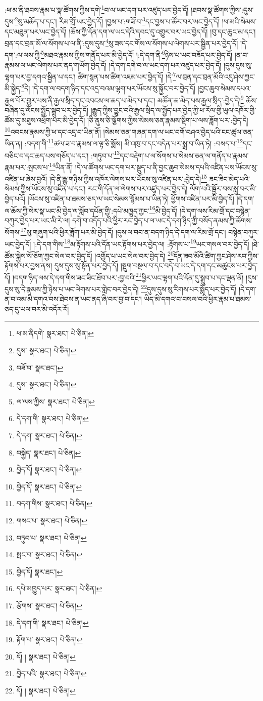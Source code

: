 :ཕ་མ་ནི་ཐབས་རྣམ་པ་སྣ་ཚོགས་ཀྱིས་དགེ་\footnote{ཕ་མ་ནིདགེ་  སྣར་ཐང་།  པེ་ཅིན། }བ་ལ་ཡང་དག་པར་འཛུད་པར་བྱེད་དོ། །ཐབས་སྣ་ཚོགས་ཀྱིས་:དུས་དུས་\footnote{དུས་  སྣར་ཐང་།  པེ་ཅིན། }སུ་མཆོད་པ་དང་། རིམ་གྲོ་ཡང་བྱེད་དོ། །བྱས་པ་:གཟོ་བ་\footnote{བཟོ་བ་  སྣར་ཐང་། }དང་བྱས་པ་ཚོར་བར་ཡང་བྱེད་དོ། །ཕ་མའི་སེམས་དང་མཐུན་པར་ཡང་བྱེད་དོ། །ཆོས་ཀྱི་དོན་དག་ལ་ཡང་དེའི་དབང་དུ་འགྱུར་བར་ཡང་བྱེད་དོ། །བུ་དང་ཆུང་མ་དང་། བྲན་དང་བྲན་མོ་ལ་སོགས་པ་ལ་ནི་:དུས་དུས་\footnote{དུས་  སྣར་ཐང་།  པེ་ཅིན། }སུ་ཟས་དང་གོས་ལ་སོགས་པ་ལེགས་པར་སྦྱིན་པར་བྱེད་དོ། །དེ་དག་:ལ་ལས་ཀྱི་\footnote{ལ་ལས་ཀྱིས་  སྣར་ཐང་།  པེ་ཅིན། }མཐའ་རྣམས་ཀྱིས་གནོད་པར་མི་བྱེད་དོ། །:དེ་དག་ནི་\footnote{དེ་དག་གི་  སྣར་ཐང་།  པེ་ཅིན། }ཉེས་པ་ཡང་བཟོད་པར་བྱེད་དོ། །ན་བ་རྣམས་ལ་ཡང་ལེགས་པར་ནད་གཡོག་བྱེད་དོ། །དེ་དག་དགེ་བ་ལ་ཡང་དག་པར་འཛུད་པར་བྱེད་དོ། །དུས་དུས་སུ་ལྷག་པར་བྱ་དགའ་སྦྱིན་པ་དང་། ཚིག་སྙན་པས་ཚིག་འཇམ་པར་བྱེད་དོ། །དེ་\footnote{དེ་དག་  སྣར་ཐང་།  པེ་ཅིན། }ལ་བྲན་དང་བྲན་མོའི་འདུ་ཤེས་ཀྱང་མི་སྐྱེད་\footnote{བསྐྱེད་  སྣར་ཐང་།  པེ་ཅིན། }དེ། །དེ་དག་ལ་བདག་ཉིད་དང་འདྲ་བའམ་ལྷག་པར་ཡོངས་སུ་སྐྱོང་བར་བྱེད་དོ། །བྱང་ཆུབ་སེམས་དཔའ་རྒྱལ་པོར་གྱུར་པས་ནི་རྒྱལ་སྲིད་དང་འབངས་ལ་ཆད་པ་མེད་པ་དང་། མཚོན་ཆ་མེད་པས་རྒྱལ་སྲིད་:བྱེད་དེ།\footnote{བྱེད་དོ།  སྣར་ཐང་།  པེ་ཅིན། } ཆོས་བཞིན་དུ་ལོངས་སྤྱོད་སྒྲུབ་པར་བྱེད་དོ། །རྒྱུད་ཀྱིས་བྱུང་བའི་རྒྱལ་སྲིད་ལ་སྤྱོད་པར་བྱེད་ཀྱི་ཕ་རོལ་གྱི་ཡུལ་འཁོར་གྱི་ཚོམ་དུ་མཐུས་འཕྲོག་པར་མི་བྱེད་དོ། །ཅི་ནུས་ཅི་ལྕོགས་ཀྱིས་སེམས་ཅན་རྣམས་སྡིག་པ་ལས་ཟློག་པར་:བྱེད་དེ། \footnote{བྱེད་དོ་  སྣར་ཐང་།  པེ་ཅིན། }འབངས་རྣམས་ཀྱི་ཕ་དང་འདྲ་བ་ཡིན་ནོ། །སེམས་ཅན་གཞན་དག་ལ་ཡང་བགོ་བཤའ་བྱེད་པའི་ངང་ཚུལ་ཅན་ཡིན་ན། :བདག་གི་\footnote{བདག་གིས་  སྣར་ཐང་།  པེ་ཅིན། }ཚལ་ཟ་བ་རྣམས་ལ་ལྟ་ཅི་སྨོས། མི་འཁུ་བ་དང་བདེན་པར་སྨྲ་བ་ཡིན་ཏེ། :བསད་པ་\footnote{གསང་པ་  སྣར་ཐང་།  པེ་ཅིན། }དང་བཅིང་བ་དང་ཆད་པས་གཅོད་པ་དང་། :གཏུབ་པ་\footnote{བཏུབ་པ་  སྣར་ཐང་།  པེ་ཅིན། }དང་བརྡེག་པ་ལ་སོགས་པ་སེམས་ཅན་ལ་གནོད་པ་རྣམས་རྣམ་པར་:སྤངས་པ་\footnote{སྤང་བ་  སྣར་ཐང་།  པེ་ཅིན། }ཡིན་ནོ། །དེ་ལ་ཚོགས་ཡང་དག་པར་སྡུད་པ་ནི་བྱང་ཆུབ་སེམས་དཔའི་འཛིན་པས་ཡོངས་སུ་འཛིན་པ་ཞེས་བྱའོ། །དེ་ནི་རྒྱུ་གཉིས་ཀྱིས་འཁོར་ལེགས་པར་ཡོངས་སུ་འཛིན་པར་:བྱེད་དེ།\footnote{བྱེད་དོ།  སྣར་ཐང་། } ཟང་ཟིང་མེད་པའི་སེམས་ཀྱིས་ཡོངས་སུ་འཛིན་པ་དང་། རང་གི་དོན་ལ་ལེགས་པར་འཛུད་པར་བྱེད་དེ། ལོག་པའི་སྦྱོར་བས་སླུ་བར་མི་བྱེད་པའོ། །ཡོངས་སུ་འཛིན་པ་ཐམས་ཅད་ལ་ཡང་སེམས་སྙོམས་པ་ཡིན་ཏེ། ཕྱོགས་འཛིན་པར་མི་བྱེད་དོ། །དེ་དག་ལ་ཆོས་ཀྱི་སེར་སྣ་ཡང་མི་བྱེད་ལ་སློབ་དཔོན་གྱི་:དཔེ་མཁྱུད་ཀྱང་\footnote{དཔེ་མཁྱུད་པར་  སྣར་ཐང་།  པེ་ཅིན། }མི་བྱེད་དོ། །དེ་དག་ལས་རིམ་གྲོ་དང་བསྙེན་བཀུར་བྱེད་པར་ཡང་མི་རེ་ལ། དགེ་བ་འདོད་པའི་ཕྱིར་རང་བྱེད་པ་ལ་ཡང་དེ་དག་ཉིད་ཀྱི་བསོད་ནམས་ཀྱི་ཚོགས་སོགས་\footnote{རྩོགས་  སྣར་ཐང་།  པེ་ཅིན། }སུ་གཞུག་པའི་ཕྱིར་ཟློག་པར་མི་བྱེད་དོ། །དུས་ལ་བབ་ན་བདག་ཉིད་དེ་དག་ལ་རིམ་གྲོ་དང་། བསྙེན་བཀུར་ཡང་བྱེད་དོ། །:དེ་དག་གིས་\footnote{དེ་དག་གི་  སྣར་ཐང་།  པེ་ཅིན། }མ་རྟོགས་པའི་དོན་ཡང་རྟོགས་པར་བྱེད་ལ། :རྟོགས་པ་\footnote{རྟོག་པ་  སྣར་ཐང་།  པེ་ཅིན། }ཡང་གསལ་བར་བྱེད་དོ། །ཐེ་ཚོམ་སྐྱེས་སོ་ཅོག་ཀྱང་སེལ་བར་བྱེད་དོ། །འགྱོད་པ་ཡང་སེལ་བར་བྱེད་དེ། \footnote{དོ། །   སྣར་ཐང་།  པེ་ཅིན། }དོན་ཟབ་མོའི་ཚིག་ཀྱང་ཤེས་རབ་ཀྱིས་རྟོགས་པར་བྱས་ནས། དུས་དུས་སུ་སྟོན་པར་བྱེད་དོ། །སྡུག་བསྔལ་བ་དང་བདེ་བ་ཡང་དེ་དག་དང་མཚུངས་པར་བྱེད་དོ། །བདག་ཉིད་ལས་དེ་དག་གིས་ཟང་ཟིང་ཐོབ་པར་:བྱ་བའི་\footnote{བྱེད་པའི་  སྣར་ཐང་།  པེ་ཅིན། }ཕྱིར་ཡང་ལྷག་པའི་དོན་དུ་སྒྲུབ་པ་དང་ལྡན་ནོ། །དུས་དུས་སུ་དེ་རྣམས་ཀྱི་ཉེས་པ་ཡང་ལེགས་པར་གླེང་བར་བྱེད་དེ། \footnote{དོ། །   སྣར་ཐང་།  པེ་ཅིན། }དུས་དུས་སུ་རིགས་པར་སྨོད་པར་བྱེད་དོ། །དེ་དག་ན་བ་འམ་མི་དགའ་བས་ཐེབས་ན་ཡང་ནད་ཞི་བར་བྱ་བ་དང་། ཡིད་མི་དགའ་བ་བསལ་བའི་ཕྱིར་རྣམ་པ་ཐམས་ཅད་དུ་ཡལ་བར་མི་འདོར་རོ། 